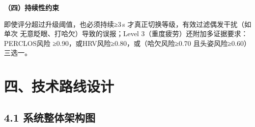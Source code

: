 \documentclass[a4paper,12pt]{article}
\begin{document}
\textbf{（四）持续性约束}

即使评分超过升级阈值，也必须持续≥3\,s 才真正切换等级，有效过滤偶发干扰（如单次
无意眨眼、打哈欠）导致的误报；Level 3（重度疲劳）还附加多证据要求：PERCLOS风险
≥0.90，或HRV风险≥0.80，或（哈欠风险≥0.70 且头姿风险≥0.60）三选一。

\section*{四、技术路线设计}

\subsection*{4.1 系统整体架构图}
\end{document}

